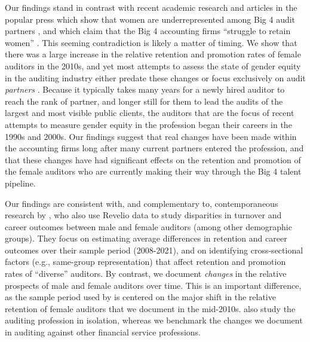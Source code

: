 \documentclass[11pt]{article}
\begin{document}
    Our findings stand in contrast with recent academic research and articles in the popular press which show that women are underrepresented among Big 4 audit partners \parencite{burkeAuditPartnerIdentification2019, leeAuditPartnerAssignments2019, rapoportWomenRarelyRun2018}, and which claim that the Big 4 accounting firms ``struggle to retain women'' \parencite{kornbergerChangingGenderDomination2010}. This seeming contradiction is likely a matter of timing. We show that there was a large increase in the relative retention and promotion rates of female auditors in the 2010s, and yet most attempts to assess the state of gender equity in the auditing industry either predate these changes \parencite{kornbergerChangingGenderDomination2010, daltonWomenManagersPartners1997,anderson-goughHelpingThemForget2005} or focus exclusively on audit \textit{partners} \parencite{burkeAuditPartnerIdentification2019, leeAuditPartnerAssignments2019, rapoportWomenRarelyRun2018}. Because it typically takes many years for a newly hired auditor to reach the rank of partner, and longer still for them to lead the audits of the largest and most visible public clients, the auditors that are the focus of recent attempts to measure gender equity in the profession began their careers in the 1990s and 2000s. Our findings suggest that real changes have been made within the accounting firms long after many current partners entered the profession, and that these changes have had significant effects on the retention and promotion of the female auditors who are currently making their way through the Big 4 talent pipeline. 

    Our findings are consistent with, and complementary to, contemporaneous research by \textcite{ahnDiversityCareerTrajectories}, who also use Revelio data to study disparities in turnover and career outcomes between male and female auditors (among other demographic groups). They focus on estimating average differences in retention and career outcomes over their sample period (2008-2021), and on identifying cross-sectional factors (e.g., same-group representation) that affect retention and promotion rates of ``diverse'' auditors. By contrast, we document \textit{changes} in the relative prospects of male and female auditors over time. This is an important difference, as the sample period used by \textcite{ahnDiversityCareerTrajectories} is centered on the major shift in the relative retention of female auditors that we document in the mid-2010s. \textcite{ahnDiversityCareerTrajectories} also study the auditing profession in isolation, whereas we benchmark the changes we document in auditing against other financial service professions.
    
\end{document}
